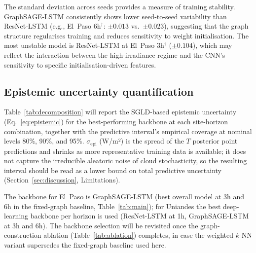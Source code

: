 The standard deviation across seeds provides a measure of training stability.
GraphSAGE-LSTM consistently shows lower seed-to-seed variability than ResNet-LSTM
(e.g., El~Paso 6h$^\dagger$: $\pm 0.013$ vs.\ $\pm 0.023$), suggesting that the graph
structure regularises training and reduces sensitivity to weight initialisation.
The most unstable model is ResNet-LSTM at El~Paso 3h$^\dagger$ ($\pm 0.104$), which may
reflect the interaction between the high-irradiance regime and the CNN's sensitivity
to specific initialisation-driven features.

\subsection{Epistemic uncertainty quantification}
\label{ssec:uq_results}

Table~\ref{tab:decomposition} will report the SGLD-based epistemic
uncertainty (Eq.~\ref{eq:epistemic}) for the best-performing backbone at
each site-horizon combination, together with the predictive interval's
empirical coverage at nominal levels 80\%, 90\%, and 95\%. $\sigma_\text{epi}$
(W/m²) is the spread of the $T$ posterior point predictions and shrinks as
more representative training data is available; it does not capture the
irreducible aleatoric noise of cloud stochasticity, so the resulting
interval should be read as a lower bound on total predictive uncertainty
(Section~\ref{sec:discussion}, Limitations).

The backbone for El~Paso is GraphSAGE-LSTM (best overall model at 3h and 6h
in the fixed-graph baseline, Table~\ref{tab:main}); for Uniandes the best
deep-learning backbone per horizon is used (ResNet-LSTM at 1h, GraphSAGE-LSTM
at 3h and 6h). The backbone selection will be revisited once the
graph-construction ablation (Table~\ref{tab:ablation}) completes, in case the
weighted $k$-NN variant supersedes the fixed-graph baseline used here.


